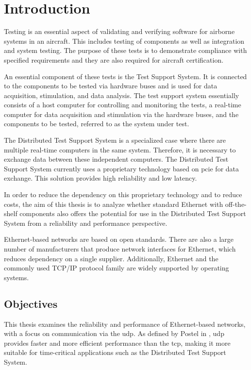 \chapter{Introduction} \label{chap:introduction}
Testing is an essential aspect of validating and verifying software for airborne systems in an aircraft. This includes testing of components as well as integration and system testing. The purpose of these tests is to demonstrate compliance with specified requirements and they are also required for aircraft certification.

An essential component of these tests is the Test Support System. It is connected to the components to be tested via hardware buses and is used for data acquisition, stimulation, and data analysis. The test support system essentially consists of a host computer for controlling and monitoring the tests, a real-time computer for data acquisition and stimulation via the hardware buses, and the components to be tested, referred to as the system under test.

The Distributed Test Support System is a specialized case where there are multiple real-time computers in the same system. Therefore, it is necessary to exchange data between these independent computers. The Distributed Test Support System currently uses a proprietary technology based on \ac{pcie} for data exchange. This solution provides high reliability and low latency.

In order to reduce the dependency on this proprietary technology and to reduce costs, the aim of this thesis is to analyze whether standard Ethernet with off-the-shelf components also offers the potential for use in the Distributed Test Support System from a reliability and performance perspective.

Ethernet-based networks are based on open standards. There are also a large number of manufacturers that produce network interfaces for Ethernet, which reduces dependency on a single supplier. Additionally, Ethernet and the commonly used TCP/IP protocol family are widely supported by operating systems.


\section{Objectives} \label{chap:introduction:research_questions}
This thesis examines the reliability and performance of Ethernet-based networks, with a focus on communication via the \ac{udp}. As defined by Postel in \cite{introRelW04}, \ac{udp} provides faster and more efficient performance than the \ac{tcp}, making it more suitable for time-critical applications such as the Distributed Test Support System.


